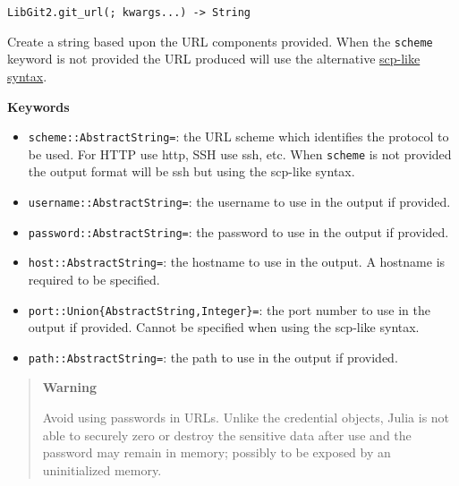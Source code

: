 \begin{adjustwidth}{2em}{0pt}


\begin{verbatim}
LibGit2.git_url(; kwargs...) -> String
\end{verbatim}

Create a string based upon the URL components provided. When the \texttt{scheme} keyword is not provided the URL produced will use the alternative \href{https://git-scm.com/docs/git-clone\#\_git\_urls\_a\_id\_urls\_a}{scp-like syntax}.

\textbf{Keywords}

\begin{itemize}
\item \texttt{scheme::AbstractString={\textquotedbl}{\textquotedbl}}: the URL scheme which identifies the protocol to be used. For HTTP use {\textquotedbl}http{\textquotedbl}, SSH use {\textquotedbl}ssh{\textquotedbl}, etc. When \texttt{scheme} is not provided the output format will be {\textquotedbl}ssh{\textquotedbl} but using the scp-like syntax.


\item \texttt{username::AbstractString={\textquotedbl}{\textquotedbl}}: the username to use in the output if provided.


\item \texttt{password::AbstractString={\textquotedbl}{\textquotedbl}}: the password to use in the output if provided.


\item \texttt{host::AbstractString={\textquotedbl}{\textquotedbl}}: the hostname to use in the output. A hostname is required to be specified.


\item \texttt{port::Union\{AbstractString,Integer\}={\textquotedbl}{\textquotedbl}}: the port number to use in the output if provided. Cannot be specified when using the scp-like syntax.


\item \texttt{path::AbstractString={\textquotedbl}{\textquotedbl}}: the path to use in the output if provided.

\end{itemize}
\begin{quote}
\textbf{Warning}

Avoid using passwords in URLs. Unlike the credential objects, Julia is not able to securely zero or destroy the sensitive data after use and the password may remain in memory; possibly to be exposed by an uninitialized memory.


\end{quote}
\end{adjustwidth}
